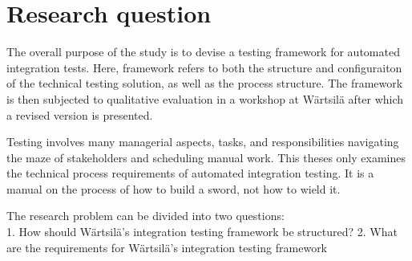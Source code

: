 \documentclass[12pt,a4paper,oneside,pdftex]{report}
\begin{document}
\section{Research question}

The overall purpose of the study is to devise a testing framework for automated integration tests. Here, framework refers to both the structure and configuraiton of the technical testing solution, as well as the process structure. The framework is then subjected to qualitative evaluation in a workshop at Wärtsilä after which a revised version is presented. 

Testing involves many managerial aspects, tasks, and responsibilities navigating the maze of stakeholders and scheduling manual work. This theses only examines the technical process requirements of automated integration testing. It is a manual on the process of how to build a sword, not how to wield it. 

The research problem can be divided into two questions: \\

1. How should Wärtsilä's integration testing framework be structured?       %
2. What are the requirements for Wärtsilä's integration testing framework   %
\end{document}
